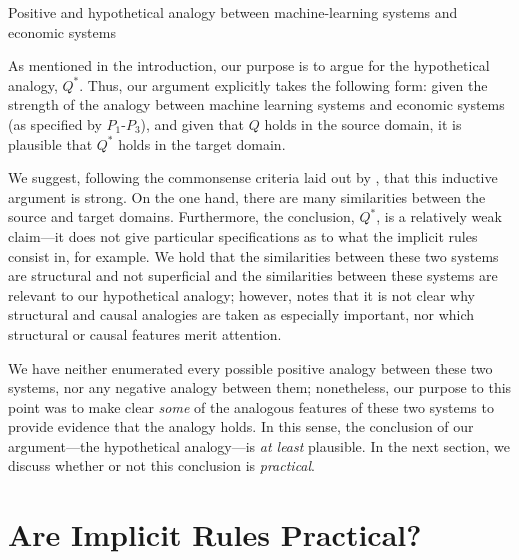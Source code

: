 \documentclass{amsart}
\theoremstyle{indented}
\theoremstyle{indentedProp}
\theoremstyle{indented}
\theoremstyle{indented}
\theoremstyle{indented}
\theoremstyle{indented}
\theoremstyle{indented}
\begin{document}
\begin{table}[htb!]
\begin{multicols}{2}
    \end{multicols}
    
    \caption{Positive and hypothetical analogy between machine-learning systems and economic systems}
    \label{tab:PosAnalogy}
\end{table}

As mentioned in the introduction, our purpose is to argue for the hypothetical analogy, $Q^{*}$. Thus, our argument explicitly takes the following form: given the strength of the analogy between machine learning systems and economic systems (as specified by $P_{1}$-$P_{3}$), and given that $Q$ holds in the source domain, it is plausible that $Q^{*}$ holds in the target domain.

We suggest, following the commonsense criteria laid out by \citet{sep-reasoning-analogy}, that this inductive argument is strong. On the one hand, there are many similarities between the source and target domains. Furthermore, the conclusion, $Q^{*}$, is a relatively weak claim---it does not give particular specifications as to what the implicit rules consist in, for example. We hold that the similarities between these two systems are structural and not superficial and the similarities between these systems are relevant to our hypothetical analogy; however, \citet{sep-reasoning-analogy} notes that it is not clear why structural and causal analogies are taken as especially important, nor which structural or causal features merit attention. 

We have neither enumerated every possible positive analogy between these two systems, nor any negative analogy between them; nonetheless, our purpose to this point was to make clear {\it some} of the analogous features of these two systems to provide evidence that the analogy holds. In this sense, the conclusion of our argument---the hypothetical analogy---is {\it at least} plausible. In the next section, we discuss whether or not this conclusion is {\it practical}.

\section{Are Implicit Rules Practical?}
\label{sec:Possibility}
\end{document}
